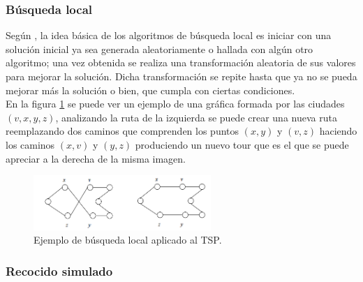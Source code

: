 \subsubsection {Búsqueda local}  
Según \cite{[ADPEREZ]}, la idea básica de los algoritmos de búsqueda local es iniciar con una solución inicial ya sea generada aleatoriamente o hallada con algún otro algoritmo; una vez obtenida se realiza una transformación aleatoria de sus valores para mejorar la solución. Dicha transformación se repite hasta que ya no se pueda mejorar más la solución o bien, que cumpla con ciertas condiciones.\\
\hspace*{1cm}En la figura \ref{fig:EXPLOCAL.png} se puede ver un ejemplo de una gráfica formada por las ciudades $(v, x, y, z)$, analizando la ruta de la izquierda se puede crear una nueva ruta reemplazando dos caminos que comprenden los puntos $(x,y)$ y $(v,z)$ haciendo los caminos $(x,v)$ y $(y,z)$ produciendo un nuevo tour que es el que se puede apreciar a la derecha de la misma imagen.\\

    \begin{figure}[hbtp]
        \centering
            \includegraphics[width=0.6\textwidth]{MarcoTeorico/Imagenes/EXPLOCAL.png}
            \caption{Ejemplo de búsqueda local aplicado al TSP.}                       
            \label{fig:EXPLOCAL.png}
    \end{figure} 
    
\subsubsection {Recocido simulado}  

